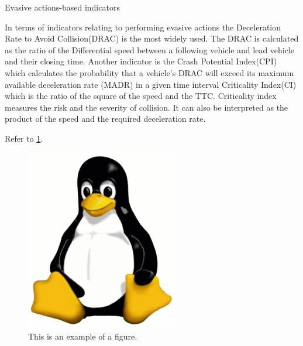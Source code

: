 Evasive actions-based indicators

In terms of  indicators relating to  performing evasive actions the Deceleration Rate to Avoid Collision(DRAC) is the most widely used. The DRAC is calculated as  the ratio of the Differential speed between a following vehicle and lead vehicle   and their closing time\autocite{almqvist1991use,mahmud2017application}. Another indicator is the Crash Potential Index(CPI) which calculates the probability that a vehicle’s DRAC will exceed its maximum available deceleration rate (MADR) in a given time interval\autocite{cunto2009simulated} Criticality Index(CI) which is the ratio of the square of the speed and the TTC.  Criticality index measures the risk and the severity of collision. It can also be interpreted as the product of the speed and the required deceleration rate\autocite{chan2006defining}.

Refer to \cref{fig:tux}.

\begin{figure}
    \centering
    \includegraphics{figs/tux.png}
    \caption{This is an example of a figure.}
    \label{fig:tux}
\end{figure}
